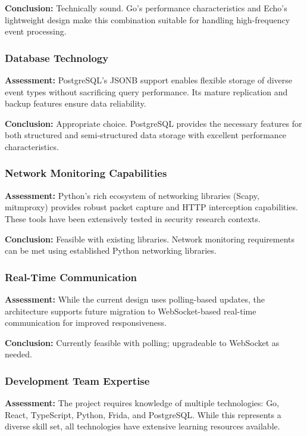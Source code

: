\textbf{Conclusion:} Technically sound. Go's performance characteristics and Echo's lightweight design make this combination suitable for handling high-frequency event processing.

\subsubsection{Database Technology}

\textbf{Assessment:} PostgreSQL's JSONB support enables flexible storage of diverse event types without sacrificing query performance. Its mature replication and backup features ensure data reliability.

\textbf{Conclusion:} Appropriate choice. PostgreSQL provides the necessary features for both structured and semi-structured data storage with excellent performance characteristics.

\subsubsection{Network Monitoring Capabilities}

\textbf{Assessment:} Python's rich ecosystem of networking libraries (Scapy, mitmproxy) provides robust packet capture and HTTP interception capabilities. These tools have been extensively tested in security research contexts.

\textbf{Conclusion:} Feasible with existing libraries. Network monitoring requirements can be met using established Python networking libraries.

\subsubsection{Real-Time Communication}

\textbf{Assessment:} While the current design uses polling-based updates, the architecture supports future migration to WebSocket-based real-time communication for improved responsiveness.

\textbf{Conclusion:} Currently feasible with polling; upgradeable to WebSocket as needed.

\subsubsection{Development Team Expertise}

\textbf{Assessment:} The project requires knowledge of multiple technologies: Go, React, TypeScript, Python, Frida, and PostgreSQL. While this represents a diverse skill set, all technologies have extensive learning resources available.

